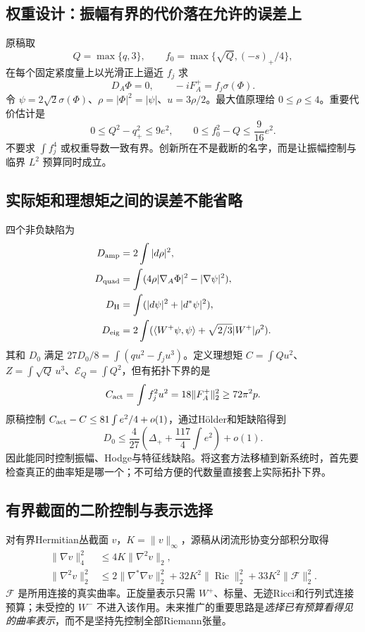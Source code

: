 \documentclass[UTF8,fontset=fandol,zihao=-4]{ctexart}
\theoremstyle{research}
\DeclareMathOperator{\Ric}{Ric}\DeclareMathOperator{\Rm}{Rm}
\begin{document}
\subsection{权重设计：振幅有界的代价落在允许的误差上}
原稿取
\[
 Q=\max\{q,3\},\qquad f_0=\max\{\sqrt Q,(-s)_+/4\},
\]
在每个固定紧度量上以光滑正上逼近 $f_j$ 求
\[
 D_A\Phi=0,\qquad -iF_A^+=f_j\sigma(\Phi).
\]
令 $\psi=2\sqrt2\sigma(\Phi)$、$\rho=|\Phi|^2=|\psi|$、$u=3\rho/2$。最大值原理给 $0\le\rho\le4$。重要代价估计是
\begin{equation}
 0\le Q^2-q_+^2\le9e^2,
 \qquad 0\le f_0^2-Q\le\frac9{16}e^2.
\end{equation}
不要求 $\int f_j^4$ 或权重导数一致有界。创新所在不是截断的名字，而是让振幅控制与临界 $L^2$ 预算同时成立。

\subsection{实际矩和理想矩之间的误差不能省略}
四个非负缺陷为
\begin{align*}
 D_{\rm amp}&=2\int|d\rho|^2,\\
 D_{\rm quad}&=\int(4\rho|\nabla_A\Phi|^2-|\nabla\psi|^2),\\
 D_{\rm H}&=\int(|d\psi|^2+|d^*\psi|^2),\\
 D_{\rm eig}&=2\int(\langle W^+\psi,\psi\rangle+
                           \sqrt{2/3}|W^+|\rho^2).
\end{align*}
其和 $D_0$ 满足 $27D_0/8=\int(qu^2-f_j u^3)$。定义理想矩 $C=\int Qu^2$、$Z=\int\sqrt Q\,u^3$、$\mathcal E_Q=\int Q^2$，但有拓扑下界的是
\[
 C_{\rm act}=\int f_j^2u^2=18\|F_A^+\|_2^2\ge72\pi^2p.
\]
原稿控制 $C_{\rm act}-C\le81\int e^2/4+o(1)$，通过Hölder和矩缺陷得到
\[
 D_0\le\frac4{27}\left(\Delta_++\frac{117}{4}\int e^2\right)+o(1).
\]
因此能同时控制振幅、Hodge与特征线缺陷。将这套方法移植到新系统时，首先要检查真正的曲率矩是哪一个；不可给方便的代数量直接套上实际拓扑下界。

\subsection{有界截面的二阶控制与表示选择}
对有界Hermitian丛截面 $v$，$K=\|v\|_\infty$，源稿从闭流形协变分部积分取得
\begin{align}
 \|\nabla v\|_4^2&\le4K\|\nabla^2v\|_2,\\
 \|\nabla^2v\|_2^2&\le2\|\nabla^*\nabla v\|_2^2
                +32K^2\|\Ric\|_2^2+33K^2\|\mathscr F\|_2^2.\label{eq:hessian}
\end{align}
$\mathscr F$ 是所用连接的真实曲率。正旋量表示只需 $W^+$、标量、无迹Ricci和行列式连接预算；未受控的 $W^-$ 不进入该作用。未来推广的重要思路是\emph{选择已有预算看得见的曲率表示}，而不是坚持先控制全部Riemann张量。
\end{document}
